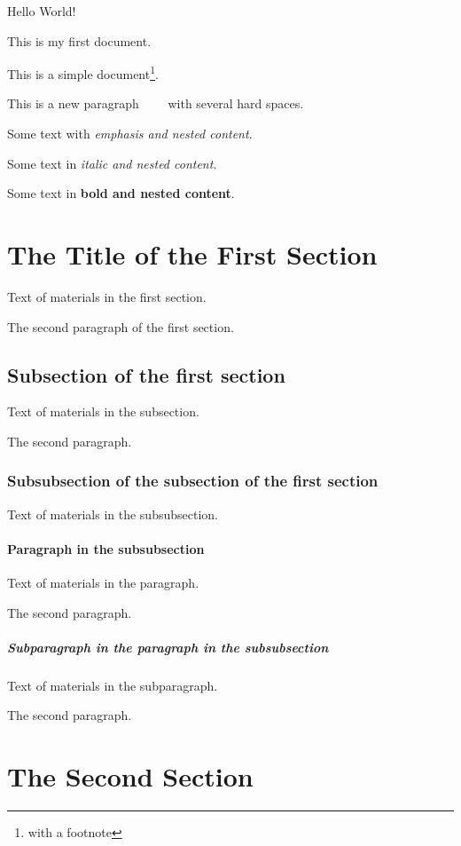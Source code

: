 \documentclass{report} %
\begin{document}
Hello World!

This is my first document.

This is a simple
document\footnote{with a footnote}.

This is a new     paragraph ~~~~with several hard spaces.

Some text with \emph{emphasis and \emph{nested content}}.

Some text in \textit{italic and \textit{nested content}}.

Some text in \textbf{bold and \textbf{nested content}}.

\section{The Title of the First Section}

Text of materials in the first section.

The second paragraph of the first section.

\subsection{Subsection of the first section}

Text of materials in the subsection.

The second paragraph.

\subsubsection{Subsubsection of the subsection of the first section}

Text of materials in the subsubsection.

\paragraph{Paragraph in the subsubsection}

Text of materials in the paragraph.

The second paragraph.

\subparagraph{Subparagraph in the paragraph in the subsubsection}

Text of materials in the subparagraph.

The second paragraph.

\section{The Second Section}
\end{document}
